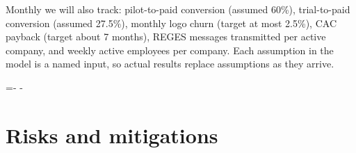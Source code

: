 \documentclass[10pt,a4paper]{article}
\makeatletter
\newcommand{\cereloc}[1]{\par\begingroup\dimen@=#1\relax
  \dimen@ii=\pagegoal\advance\dimen@ii-\pagetotal
  \ifdim\dimen@>\dimen@ii\ifdim\dimen@ii>\z@\vfil\fi\penalty-\@M\fi\endgroup}
\makeatother
\begin{document}
Monthly we will also track: pilot-to-paid conversion (assumed 60\%), trial-to-paid conversion
(assumed 27.5\%), monthly logo churn (target at most 2.5\%), CAC payback (target about 7 months),
REGES messages transmitted per active company, and weekly active employees per company. Each
assumption in the model is a named input, so actual results replace assumptions as they arrive.

\cereloc{18\baselineskip}
\section{Risks and mitigations}\label{sec:riscuri}\nobreak
\end{document}
